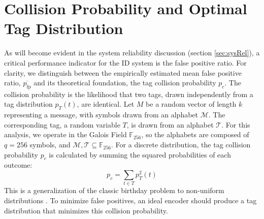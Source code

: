 \documentclass[english,BCOR=4mm,cdfont=false]{tudscrreprt} %
\begin{document}
\section{Collision Probability and Optimal Tag Distribution} 
\label{sec:collision_prob}
As will become evident in the system reliability discussion (section \ref{sec:sysRel}), a critical performance indicator for the ID system is the false positive ratio. For clarity, we distinguish between the empirically estimated mean false positive ratio, $\overline{p_\text{fp}}$ and its theoretical foundation, the tag collision probability $p_c$. The collision probability is the likelihood that two tags, drawn independently from a tag distribution $p_T(t)$, are identical. 
Let $M$ be a random vector of length $k$ representing a message, with symbols drawn from an alphabet $\mathcal{M}$. The corresponding tag, a random variable $T$, is drawn from an alphabet $\mathcal{T}$. For this analysis, we operate in the Galois Field $\mathbb{F}_{256}$, so the alphabets are composed of $q=256$ symbols, and $\mathcal{M}, \mathcal{T} \subseteq \mathbb{F}_{256}$.
For a discrete distribution, the tag collision probability $p_c$ is calculated by summing the squared probabilities of each outcome:
\begin{equation}
p_c = \sum_{t \in T} p_T^2(t)
\end{equation}
This is a generalization of the classic birthday problem to non-uniform distributions \cite{feller1968introduction}. To minimize false positives, an ideal encoder should produce a tag distribution that minimizes this collision probability.
\end{document}
